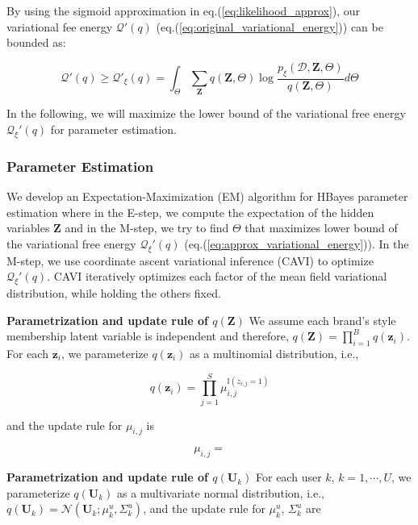 By using the sigmoid approximation in eq.(\ref{eq:likelihood_approx}), our variational fee energy $\mathcal{Q}'(q)$ (eq.(\ref{eq:original_variational_energy})) can be bounded as:

\begin{equation}
\label{eq:approx_variational_energy}
\mathcal{Q}'(q) \geq \mathcal{Q}'_{\xi}(q) = \int_\Theta \sum_{\bm{Z}} q(\bm{Z},\Theta) \log\frac{p_{\xi}(\mathcal{D},\bm{Z},\Theta)}{q(\bm{Z},\Theta)}d\Theta
\end{equation}

In the following, we will maximize the lower bound of the variational free energy $\mathcal{Q}_{\xi}'(q) $ for parameter estimation.

\subsubsection{Parameter Estimation}
\label{sec:param}

We develop an Expectation-Maximization (EM) algorithm for HBayes parameter estimation where in the E-step, we compute the expectation of the hidden variables $\mathbf{Z}$ and in the M-step, we try to find $\Theta$ that maximizes lower bound of the variational free energy $\mathcal{Q}_{\xi}'(q)$ (eq.(\ref{eq:approx_variational_energy})). In the M-step, we use coordinate ascent variational inference (CAVI) \cite{bishop2006pattern} to optimize $\mathcal{Q}_{\xi}'(q)$. CAVI iteratively optimizes each factor of the mean field variational distribution, while holding the others fixed.

\noindent \textbf{Parametrization and update rule of $q(\mathbf{Z})$}
We assume each brand's style membership latent variable is independent and therefore, $q(\mathbf{Z}) = \prod_{i=1}^B q(\mathbf{z}_i)$. For each $\mathbf{z}_i$, we parameterize $q(\mathbf{z}_i)$ as a multinomial distribution, i.e.,

$$q(\mathbf{z}_i) = \prod_{j=1}^S \mu_{i,j}^{\mathbb{I}(z_{i,j}=1)}$$

and the update rule for $\mu_{i,j}$ is  

\begin{equation}
\label{eq:hidden}
\mu_{i,j} =  
\end{equation}

\noindent \textbf{Parametrization and update rule of $q(\mathbf{U}_k)$}
For each user $k$, $k = 1, \cdots, U$, we parameterize $q(\mathbf{U}_k)$ as a multivariate normal distribution, i.e., $q(\mathbf{U}_k) = \mathcal{N}(\mathbf{U}_k; \mu^u_k, \Sigma_k^u)$, and the update rule for $\mu^u_k$, $\Sigma_k^u$ are 

